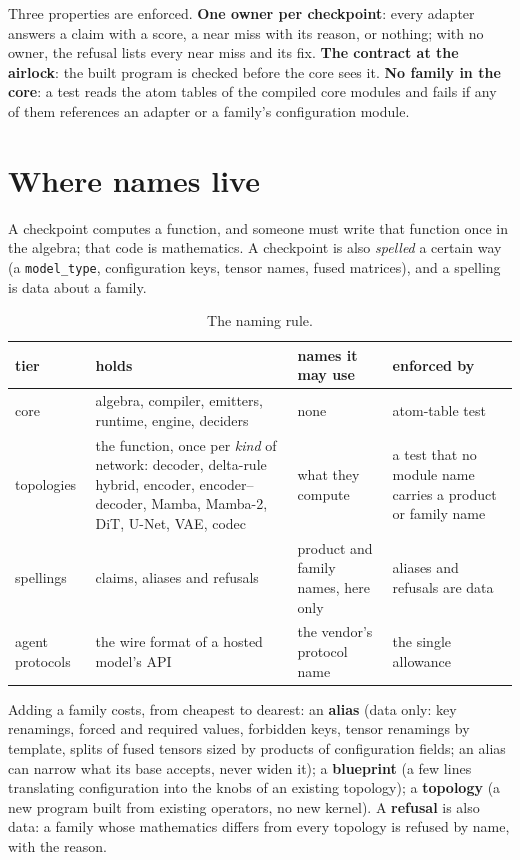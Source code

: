 Three properties are enforced. \textbf{One owner per checkpoint}: every adapter answers a claim with a
score, a near miss with its reason, or nothing; with no owner, the refusal lists every near miss and its
fix. \textbf{The contract at the airlock}: the built program is checked before the core sees it.
\textbf{No family in the core}: a test reads the atom tables of the compiled core modules and fails if
any of them references an adapter or a family's configuration module.

\section{Where names live}

A checkpoint computes a function, and someone must write that function once in the algebra; that code is
mathematics. A checkpoint is also \emph{spelled} a certain way (a \texttt{model\_type}, configuration
keys, tensor names, fused matrices), and a spelling is data about a family.

\begin{table}[h]
\centering\small
\begin{tabularx}{\textwidth}{@{}lXXX@{}}
\toprule
tier & holds & names it may use & enforced by \\
\midrule
core & algebra, compiler, emitters, runtime, engine, deciders & none & atom-table test \\
topologies & the function, once per \emph{kind} of network: decoder, delta-rule hybrid, encoder, encoder--decoder, Mamba, Mamba-2, DiT, U-Net, VAE, codec & what they compute & a test that no module name carries a product or family name \\
spellings & claims, aliases and refusals & product and family names, here only & aliases and refusals are data \\
agent protocols & the wire format of a hosted model's API & the vendor's protocol name & the single allowance \\
\bottomrule
\end{tabularx}
\caption{The naming rule.}
\end{table}

Adding a family costs, from cheapest to dearest: an \textbf{alias} (data only: key renamings, forced and
required values, forbidden keys, tensor renamings by template, splits of fused tensors sized by products
of configuration fields; an alias can narrow what its base accepts, never widen it); a \textbf{blueprint}
(a few lines translating configuration into the knobs of an existing topology); a \textbf{topology} (a
new program built from existing operators, no new kernel). A \textbf{refusal} is also data: a family
whose mathematics differs from every topology is refused by name, with the reason.

